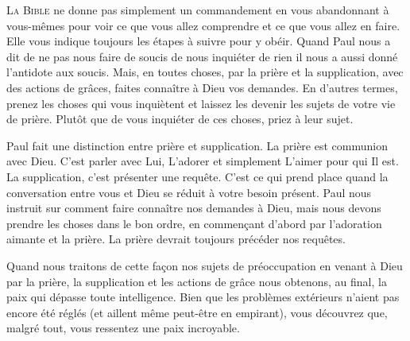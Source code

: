 
\lettrine{L}{a Bible} ne donne pas simplement un commandement
 en vous abandonnant à vous-mêmes pour voir ce que vous allez comprendre
 et ce que vous allez en faire. Elle vous indique toujours les étapes
 à suivre pour y obéir. Quand Paul nous a dit de ne pas nous faire de soucis
 \ocadr de nous \Og inquiéter de rien \Fg{} \fcadr{}
 il nous a aussi donné l'antidote aux soucis.
 \Og Mais, en toutes choses, par la prière et la supplication,
 avec des actions de grâces, faites connaître à Dieu vos demandes. \Fg{}
 En d'autres termes, prenez les choses qui vous inquiètent
 et laissez les devenir les sujets de votre vie de prière.
 Plutôt que de vous inquiéter 
 de ces choses, priez à leur sujet.


Paul fait une distinction entre prière et supplication.
 La prière est communion avec Dieu. C'est parler avec Lui, L'adorer
 et simplement L'aimer pour qui Il est. La supplication, 
 c'est présenter une requête.
 C'est ce qui prend place quand la conversation entre vous et Dieu se réduit
 à votre besoin présent. Paul nous instruit sur comment 
 faire connaître nos demandes à Dieu, mais nous devons prendre les choses
 dans le bon ordre, en commen\c{c}ant d'abord par l'adoration aimante et la prière.
 La prière devrait toujours précéder nos requêtes.

Quand nous traitons de cette fa\c{c}on nos sujets de préoccupation
 \ocadr en venant à Dieu par la prière, la supplication
 et les actions de grâce \fcadr{}
 nous obtenons, au final, la paix qui dépasse toute intelligence.
 Bien que les problèmes extérieurs n'aient pas encore été réglés
 (et aillent même peut-être en empirant), vous découvrez que, malgré tout,
 vous ressentez une paix incroyable.

\dvrule





